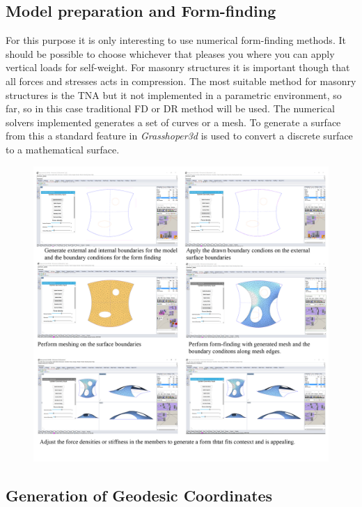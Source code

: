 \subsection{Model preparation and Form-finding}


For this purpose it is only interesting to use numerical form-finding methods. It should be possible to choose whichever that pleases you where you can apply vertical loads for self-weight. For masonry structures it is important though that all forces and stresses acts in compression. The most suitable method for masonry structures is the TNA but it not implemented in a parametric environment, so far, so in this case traditional FD or DR method will be used. The numerical solvers implemented generates a set of curves or a mesh. To generate a surface from this a standard feature in \textit{Grasshoper3d} is used to convert a discrete surface to a mathematical surface.



\begin{figure}[H]
\centering
\includegraphics[width = 1.0\linewidth ]{figure/Method/ModelGen.jpg}
\end{figure}



\subsection{Generation of Geodesic Coordinates}

